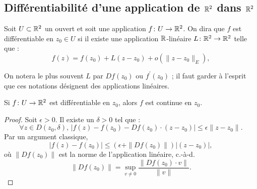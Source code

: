 \subsection{Différentiabilité d'une application de $\mathbb R^2$ dans $\mathbb R^2$}
\begin{fdefn}\label{def:1.2}
Soit $U \subset \mathbb R^2$ un ouvert et soit une application $f \colon U \to \mathbb R^2$.
On dira que $f$ est différentiable en $z_0 \in U$ si il existe une application $\mathbb R$-linéaire $ L \colon \mathbb R^2 \to \mathbb R^2$ telle que :
\[f(z)=f(z_0) + L(z-z_0) + o(\|z-z_0\|_E),\]
\end{fdefn}





On notera le plus souvent $L$ par $Df(z_0)$ ou $f^\prime(z_0)$ ; il faut garder à l'esprit que ces notations désignent des applications linéaires.
%
\begin{fprop}\label{prop:1.1}
Si $f \colon U \to \mathbb R^2$ est différentiable en $z_0$, alors $f$ est continue en $z_0$.
\end{fprop}
\begin{proof}
Soit $\epsilon > 0$. Il existe un $\delta >0$ tel que :
\[ \forall z \in D(z_0,\delta), \, \lvert f(z) - f(z_0) -Df(z_0)\cdot(z-z_0) \rvert \leq \epsilon \|z-z_0\|.\]
Par un argument classique,
\[\lvert f(z) -f(z_0)\rvert \leq \left(\epsilon + \|Df(z_0)\| \right)\lvert (z-z_0) \rvert,\]
où $\|Df(z_0)\|$ est la norme de l'application linéaire, c.-à-d. 
\[ \|Df(z_0)\| = \sup_{v \neq 0} \frac{\|Df(z_0) \cdot v\|}{\|v\|}.\]
\end{proof}

